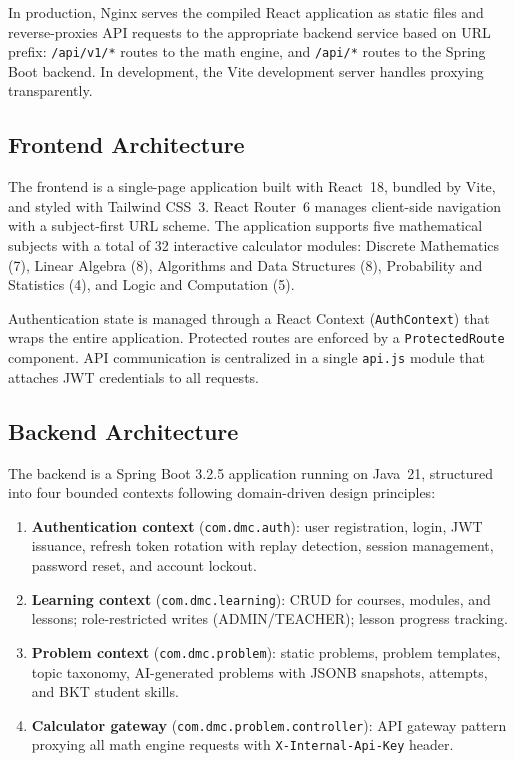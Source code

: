 In production, Nginx serves the compiled React application as static files and reverse-proxies API requests to the appropriate backend service based on URL prefix: \texttt{/api/v1/*} routes to the math engine, and \texttt{/api/*} routes to the Spring Boot backend. In development, the Vite development server handles proxying transparently.

\subsection{Frontend Architecture}
\label{subsec:frontend-arch}

The frontend is a single-page application built with React~18, bundled by Vite, and styled with Tailwind CSS~3. React Router~6 manages client-side navigation with a subject-first URL scheme. The application supports five mathematical subjects with a total of 32 interactive calculator modules: Discrete Mathematics (7), Linear Algebra (8), Algorithms and Data Structures (8), Probability and Statistics (4), and Logic and Computation (5).

Authentication state is managed through a React Context (\texttt{AuthContext}) that wraps the entire application. Protected routes are enforced by a \texttt{ProtectedRoute} component. API communication is centralized in a single \texttt{api.js} module that attaches JWT credentials to all requests.

\subsection{Backend Architecture}
\label{subsec:backend-arch}

The backend is a Spring Boot 3.2.5 application running on Java~21, structured into four bounded contexts following domain-driven design principles:

\begin{enumerate}
  \item \textbf{Authentication context} (\texttt{com.dmc.auth}): user registration, login, JWT issuance, refresh token rotation with replay detection, session management, password reset, and account lockout.
  \item \textbf{Learning context} (\texttt{com.dmc.learning}): CRUD for courses, modules, and lessons; role-restricted writes (ADMIN/TEACHER); lesson progress tracking.
  \item \textbf{Problem context} (\texttt{com.dmc.problem}): static problems, problem templates, topic taxonomy, AI-generated problems with JSONB snapshots, attempts, and BKT student skills.
  \item \textbf{Calculator gateway} (\texttt{com.dmc.problem.controller}): API gateway pattern proxying all math engine requests with \texttt{X-Internal-Api-Key} header.
\end{enumerate}

